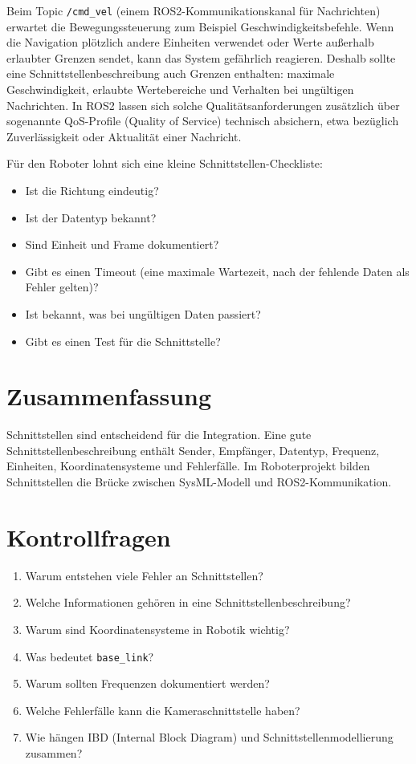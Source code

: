 Beim Topic \texttt{/cmd\_vel} (einem ROS2-Kommunikationskanal für Nachrichten) erwartet die Bewegungssteuerung zum Beispiel Geschwindigkeitsbefehle. Wenn die Navigation plötzlich andere Einheiten verwendet oder Werte außerhalb erlaubter Grenzen sendet, kann das System gefährlich reagieren. Deshalb sollte eine Schnittstellenbeschreibung auch Grenzen enthalten: maximale Geschwindigkeit, erlaubte Wertebereiche und Verhalten bei ungültigen Nachrichten. In ROS2 lassen sich solche Qualitätsanforderungen zusätzlich über sogenannte QoS-Profile (Quality of Service) technisch absichern, etwa bezüglich Zuverlässigkeit oder Aktualität einer Nachricht.

Für den Roboter lohnt sich eine kleine Schnittstellen-Checkliste:

\begin{itemize}
    \item Ist die Richtung eindeutig?
    \item Ist der Datentyp bekannt?
    \item Sind Einheit und Frame dokumentiert?
    \item Gibt es einen Timeout (eine maximale Wartezeit, nach der fehlende Daten als Fehler gelten)?
    \item Ist bekannt, was bei ungültigen Daten passiert?
    \item Gibt es einen Test für die Schnittstelle?
\end{itemize}

\section{Zusammenfassung}
Schnittstellen sind entscheidend für die Integration. Eine gute Schnittstellenbeschreibung enthält Sender, Empfänger, Datentyp, Frequenz, Einheiten, Koordinatensysteme und Fehlerfälle. Im Roboterprojekt bilden Schnittstellen die Brücke zwischen SysML-Modell und ROS2-Kommunikation.

\section{Kontrollfragen}
\begin{enumerate}
    \item Warum entstehen viele Fehler an Schnittstellen?
    \item Welche Informationen gehören in eine Schnittstellenbeschreibung?
    \item Warum sind Koordinatensysteme in Robotik wichtig?
    \item Was bedeutet \texttt{base\_link}?
    \item Warum sollten Frequenzen dokumentiert werden?
    \item Welche Fehlerfälle kann die Kameraschnittstelle haben?
    \item Wie hängen IBD (Internal Block Diagram) und Schnittstellenmodellierung zusammen?
\end{enumerate}

